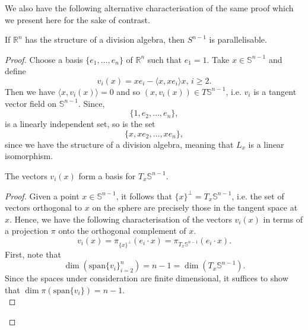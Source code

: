 We also have the following alternative characterisation of the same proof which we present here for the sake of contrast.
\begin{theorem}
If $\mathbb{R}^n$ has the structure of a division algebra, then $S^{n-1}$ is parallelisable.
\end{theorem}
\begin{proof}
Choose a basis $\{e_1,\ldots,e_n\}$ of $\mathbb{R}^n$ such that $e_1=1$. Take $x\in\mathbb{S}^{n-1}$ and define
\begin{equation}
v_i(x)=xe_i-\langle x,xe_i\rangle x,\,i\geq 2.
\label{eq:vi-orig}
\end{equation}
Then we have $\langle x,v_i(x)\rangle =0$ and so $(x,v_i(x))\in T\mathbb{S}^{n-1}$, i.e. $v_i$ is a tangent vector field on $\mathbb{S}^{n-1}$. Since,
\[
\{1,e_2,\ldots,e_n\},
\]
is a linearly independent set, so is the set
\[
\{x,xe_2,\ldots,xe_n\},
\]
since we have the structure of a division algebra, meaning that $L_x$ is a linear isomorphism.

\begin{proposition}
The vectors $v_i(x)$ form a basis for $T_x\mathbb{S}^{n-1}$.
\end{proposition}
\begin{proof}
Given a point $x\in\mathbb{S}^{n-1}$, it follows that $\{x\}^\bot=T_x\mathbb{S}^{n-1}$, i.e. the set of vectors orthogonal to $x$ on the sphere are precisely those in the tangent space at $x$.
Hence, we have the following characterisation of the vectors $v_i(x)$ in terms of a projection $\pi$ onto the orthogonal complement of $x$.
\[
v_i(x)=\pi_{\{x\}^\bot}(e_i\cdot x)=\pi_{T_x\mathbb{S}^{n-1}}(e_i\cdot x).
\]
First, note that 
\[
\dim\left(\mathrm{span}\{v_i\}_{i=2}^n\right)=n-1=\dim\left(T_x\mathbb{S}^{n-1}\right).
\]
Since the spaces under consideration are finite dimensional, it suffices to show that $\dim \pi(\mathrm{span}\{v_i\}) =n-1$.\\


\end{proof}
\end{proof}
